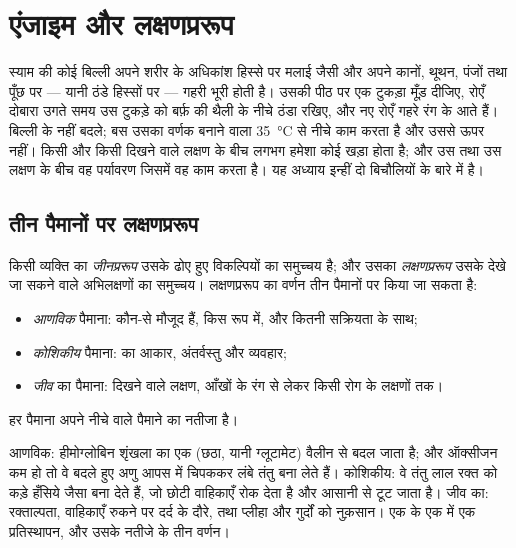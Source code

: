 \chapter{एंजाइम और लक्षणप्ररूप}\label{ch:g11:enzymes-and-phenotype}

स्याम की कोई बिल्ली अपने शरीर के अधिकांश हिस्से पर मलाई जैसी और अपने
कानों, थूथन, पंजों तथा पूँछ पर --- यानी ठंडे हिस्सों पर --- गहरी भूरी होती
है। उसकी पीठ पर एक टुकड़ा मूँड़ दीजिए, रोएँ दोबारा उगते समय उस टुकड़े को
बर्फ़ की थैली के नीचे ठंडा रखिए, और नए रोएँ गहरे रंग के आते हैं। बिल्ली के
 नहीं बदले; बस उसका वर्णक बनाने वाला  \qty{35}{\celsius} से नीचे
काम करता है और उससे ऊपर नहीं। किसी  और किसी दिखने वाले लक्षण के बीच
लगभग हमेशा कोई  खड़ा होता है; और उस  तथा उस लक्षण के बीच वह
पर्यावरण जिसमें वह काम करता है। यह अध्याय इन्हीं दो बिचौलियों के बारे में
है।

\section{तीन पैमानों पर लक्षणप्ररूप}

\begin{definition}[जीनप्ररूप और लक्षणप्ररूप]\label{def:g11:enzymes-and-phenotype:phenotype}
किसी व्यक्ति का \emph{जीनप्ररूप} उसके ढोए हुए विकल्पियों
का समुच्चय है; और उसका \emph{लक्षणप्ररूप} उसके देखे जा
सकने वाले अभिलक्षणों का समुच्चय। लक्षणप्ररूप का वर्णन तीन पैमानों पर किया
जा सकता है:
\begin{itemize}
  \item \emph{आणविक} पैमाना: कौन-से  मौजूद हैं, किस रूप में, और
        कितनी सक्रियता के साथ;
  \item \emph{कोशिकीय} पैमाना:  का आकार, अंतर्वस्तु और व्यवहार;
  \item \emph{जीव} का पैमाना: दिखने वाले लक्षण, आँखों के रंग से लेकर किसी
        रोग के लक्षणों तक।
\end{itemize}
हर पैमाना अपने नीचे वाले पैमाने का नतीजा है।
\end{definition}

\begin{example}[तीन पैमानों पर हँसिया-कोशिका रोग]\label{ex:g11:enzymes-and-phenotype:sickle}
आणविक: हीमोग्लोबिन शृंखला का एक  (छठा, यानी ग्लूटामेट) वैलीन से
बदल जाता है; और ऑक्सीजन कम हो तो वे बदले हुए अणु आपस में चिपककर लंबे तंतु
बना लेते हैं। कोशिकीय: वे तंतु लाल रक्त  को कड़े हँसिये जैसा बना देते
हैं, जो छोटी वाहिकाएँ रोक देता है और आसानी से टूट जाता है। जीव का:
रक्ताल्पता, वाहिकाएँ रुकने पर दर्द के दौरे, तथा प्लीहा और गुर्दों को
नुक़सान। एक  के एक  में एक प्रतिस्थापन, और उसके नतीजे के तीन वर्णन।
\end{example}

